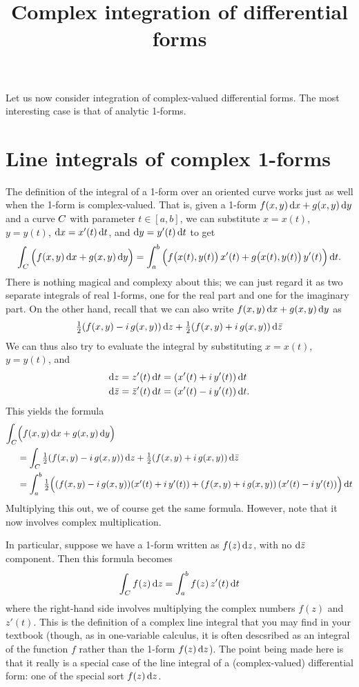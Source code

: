 \documentclass[12pt]{amsart}
\title{Complex integration of differential forms}
\begin{document}
\maketitle

Let us now consider integration of complex-valued differential forms.
The most interesting case is that of analytic 1-forms.

\section{Line integrals of complex 1-forms}
\label{sec:complex-line-integrals}

The definition of the integral of a 1-form over an oriented curve works just as well when the 1-form is complex-valued.
That is, given a 1-form $f(x,y)\,{\mathrm{d} x} + g(x,y)\,{\mathrm{d} y}$ and a curve $C$ with parameter $t\in [a,b]$, we can substitute $x = x(t)$, $y=y(t)$, ${\mathrm{d} x} = x'(t)\,{\mathrm{d} t}$, and ${\mathrm{d} y} = y'(t)\,{\mathrm{d} t}$ to get
\[ \int_{C} \Big(f(x,y)\,{\mathrm{d} x} + g(x,y)\,{\mathrm{d} y}\Big) = \int_a^b \Big( f\big(x(t),y(t)\big)\, x'(t) + g\big(x(t),y(t)\big)\,y'(t)\Big) \,{\mathrm{d} t}. \]
There is nothing magical and complexy about this; we can just regard it as two separate integrals of real 1-forms, one for the real part and one for the imaginary part.
On the other hand, recall that we can also write $f(x,y)\,{\mathrm{d} x} + g(x,y)\,{\mathrm{d} y}$ as
\[\textstyle\frac{1}{2} (f(x,y) -i\, g(x,y))\,{\mathrm{d} z} + \textstyle\frac{1}{2} (f(x,y) +i\, g(x,y))\,{\mathrm{d} \bar{z}} \]
We can thus also try to evaluate the integral by substituting $x = x(t)$, $y=y(t)$, and
\begin{align*}
  {\ensuremath{\mathrm{d} z}} &= z'(t) \,{\mathrm{d} t} = (x'(t) + i\,y'(t))\,{\mathrm{d} t}\\
  {\mathrm{d} \bar{z}} &= \bar{z}'(t) \,{\mathrm{d} t} = (x'(t) - i\,y'(t))\,{\mathrm{d} t}.
\end{align*}
This yields the formula
\begin{align*}
  \int_{C} &\Big(f(x,y)\,{\mathrm{d} x} + g(x,y)\,{\mathrm{d} y}\Big)\\
  &= \int_{C} \textstyle\frac{1}{2} (f(x,y) -i\, g(x,y))\,{\mathrm{d} z} + \textstyle\frac{1}{2} (f(x,y) +i\, g(x,y))\,{\mathrm{d} \bar{z}}\\
  &= \int_a^b \textstyle\frac{1}{2} \Big((f(x,y) -i\, g(x,y)) (x'(t) + i\,y'(t)) + (f(x,y) +i\, g(x,y))\,(x'(t) - i\,y'(t))\Big)\,{\mathrm{d} t}
\end{align*}
Multiplying this out, we of course get the same formula.
However, note that it now involves complex multiplication.

In particular, suppose we have a 1-form written as $f(z) \,{\mathrm{d} z}$, with no ${\mathrm{d} \bar{z}}$ component.
Then this formula becomes
\[ \int_{C} f(z) \,{\mathrm{d} z} = \int_a^b f(z)\, z'(t)\,{\mathrm{d} t} \]
where the right-hand side involves multiplying the complex numbers $f(z)$ and $z'(t)$.
This is the definition of a complex line integral that you may find in your textbook (though, as in one-variable calculus, it is often descsribed as an integral of the function $f$ rather than the 1-form $f(z)\,{\mathrm{d} z}$).
The point being made here is that it really is a special case of the line integral of a (complex-valued) differential form: one of the special sort $f(z)\,{\mathrm{d} z}$.
\end{document}

